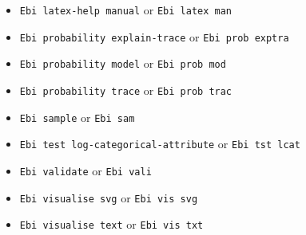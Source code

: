 {\begin{itemize}
\item\texttt{Ebi latex-help manual} or \texttt{Ebi latex man}
\item\texttt{Ebi probability explain-trace} or \texttt{Ebi prob exptra}
\item\texttt{Ebi probability model} or \texttt{Ebi prob mod}
\item\texttt{Ebi probability trace} or \texttt{Ebi prob trac}
\item\texttt{Ebi sample} or \texttt{Ebi sam}
\item\texttt{Ebi test log-categorical-attribute} or \texttt{Ebi tst lcat}
\item\texttt{Ebi validate} or \texttt{Ebi vali}
\item\texttt{Ebi visualise svg} or \texttt{Ebi vis svg}
\item\texttt{Ebi visualise text} or \texttt{Ebi vis txt}
\end{itemize}}
